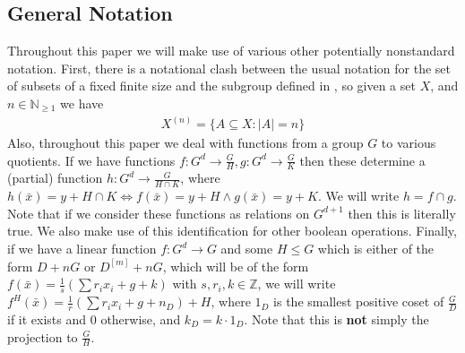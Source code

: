 \documentclass[a4paper,11pt]{article}
\renewcommand{\iff}{\Longleftrightarrow}
\newcommand{\nl}{\newline}
\begin{document}
\subsection*{General Notation}
Throughout this paper we will make use of various other potentially nonstandard notation. First, there is a notational clash between the usual notation for the set of subsets of a fixed finite size and the subgroup defined in , so given a set $X$, and $n\in \mathbb{N}_{\geq 1}$ we have
\begin{align*}
    X^{(n)} = \{A\subseteq X : |A| = n\}
\end{align*}
Also, throughout this paper we deal with functions from a group $G$ to various quotients. If we have functions $f: G^d\rightarrow \frac{G}{H}, g: G^d\rightarrow \frac{G}{K}$ then these determine a (partial) function $h: G^d\rightarrow \frac{G}{H\cap K}$, where $h(\bar x)=y+H\cap K\iff f(\bar x) = y + H \wedge g(\bar x) = y+K$. We will write $h = f\cap g$. Note that if we consider these functions as relations on $G^{d+1}$ then this is literally true. We also make use of this identification for other boolean operations.
\nl\nl
Finally, if we have a linear function $f:G^d\rightarrow G$ and some $H\leq G$ which is either of the form $D+nG$ or $D^{[m]}+nG$, which will be of the form $f(\bar x) = \frac{1}{s}(\sum r_ix_i + g + k)$ with $s,r_i,k\in\mathbb{Z}$, we will write $f^H(\bar x) = \frac{1}{r}(\sum r_ix_i + g + n_{D})+H$, where $1_D$ is the smallest positive coset of $\frac{G}{D}$ if it exists and $0$ otherwise, and $k_D = k\cdot1_D$. Note that this is \textbf{not} simply the projection to $\frac{G}{H}$.


\newpage
\end{document}

